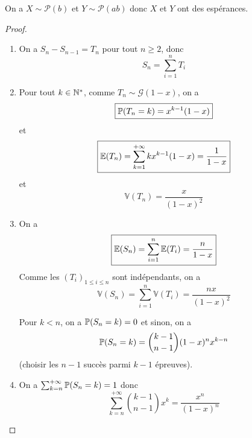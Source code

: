 \documentclass[12pt]{article}
\begin{document}
\begin{remark}
    On a $X\sim \mathcal{P}(b)$ et $Y\sim\mathcal{P}(ab)$ donc $X$ et $Y$ ont des espérances.
\end{remark}

\begin{proof}
    \phantom{}
    \begin{enumerate}
        \item On a $S_{n}-S_{n-1}=T_{n}$ pour tout $n\geqslant2$, donc 
        \begin{equation}
            \boxed{S_{n}=\sum_{i=1}^{n}T_{i}}
        \end{equation}

        \item Pour tout $k\in\N^{*}$, comme $T_{n}\sim\mathcal{G}(1-x)$, on a 
        \begin{equation}
            \boxed{\P(T_{n}=k)=x^{k-1}(1-x)}
        \end{equation}
        et 
        \begin{equation}
            \boxed{\E(T_{n})=\sum_{k=1}^{+\infty}kx^{k-1}(1-x)=\frac{1}{1-x}}
        \end{equation}
        et 
        \begin{equation}
            \boxed{\mathbb{V}(T_{n})=\frac{x}{(1-x)^{2}}}
        \end{equation}

        \item On a
        \begin{equation}
            \boxed{\E(S_{n})=\sum_{i=1}^{n}\E(T_{i})=\frac{n}{1-x}}
        \end{equation}
        Comme les $(T_{i})_{1\leqslant i\leqslant n}$ sont indépendants, on a 
        \begin{equation}
            \boxed{\mathbb{V}(S_{n})=\sum_{i=1}^{n}\mathbb{V}(T_{i})=\frac{nx}{(1-x)^{2}}}
        \end{equation}

        Pour $k<n$, on a $\P(S_{n}=k)=0$ et sinon, on a 
        \begin{equation}
            \P(S_{n}=k)=\binom{k-1}{n-1}(1-x)^{n}x^{k-n}
        \end{equation}
        (choisir les $n-1$ succès parmi $k-1$ épreuves).

        \item On a $\sum_{k=n}^{+\infty}\P(S_{n}=k)=1$ donc 
        \begin{equation}
            \boxed{\sum_{k=n}^{+\infty}\binom{k-1}{n-1}x^{k}=\frac{x^{n}}{(1-x)^{n}}}
        \end{equation}
    \end{enumerate}
\end{proof}
\end{document}
